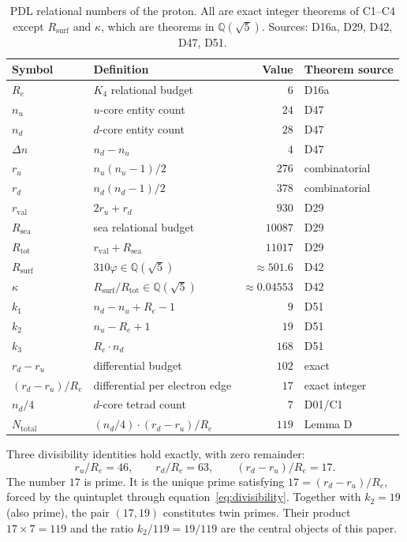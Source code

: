 \documentclass[12pt,a4paper]{article}
\theoremstyle{plain}
\theoremstyle{definition}
\theoremstyle{remark}
\newcommand{\Kfour}{K_4}
\newcommand{\vp}{\varphi}
\newcommand{\kap}{\kappa}
\newcommand{\Rtot}{R_{\mathrm{tot}}}
\newcommand{\Rsurf}{R_{\mathrm{surf}}}
\newcommand{\Rsea}{R_{\mathrm{sea}}}
\newcommand{\rval}{r_{\mathrm{val}}}
\renewcommand{\Re}{R_e}
\newcommand{\ru}{r_u}
\newcommand{\rd}{r_d}
\renewcommand{\nu}{n_u}
\newcommand{\Dn}{\Delta n}
\newcommand{\Ntot}{N_{\mathrm{total}}}
\newcommand{\kone}{k_1}
\newcommand{\ktwo}{k_2}
\newcommand{\kthree}{k_3}
\begin{document}
\begin{table}[H]
\centering
\caption{PDL relational numbers of the proton. All are exact integer theorems of C1--C4 except $\Rsurf$ and $\kap$, which are theorems in $\mathbb{Q}(\sqrt{5})$. Sources: D16a, D29, D42, D47, D51.}
\label{tab:relational}
\bigskip
\begin{tabular}{llrl}
\toprule
Symbol & Definition & Value & Theorem source \\
\midrule
$\Re$ & $\Kfour$ relational budget & $6$ & D16a \\
$n_u$ & $u$-core entity count & $24$ & D47 \\
$n_d$ & $d$-core entity count & $28$ & D47 \\
$\Dn$ & $n_d - n_u$ & $4$ & D47 \\
$\ru$ & $n_u(n_u-1)/2$ & $276$ & combinatorial \\
$\rd$ & $n_d(n_d-1)/2$ & $378$ & combinatorial \\
$\rval$ & $2\ru + \rd$ & $930$ & D29 \\
$\Rsea$ & sea relational budget & $10087$ & D29 \\
$\Rtot$ & $\rval + \Rsea$ & $11017$ & D29 \\
$\Rsurf$ & $310\vp \in \mathbb{Q}(\sqrt{5})$ & $\approx 501.6$ & D42 \\
$\kap$ & $\Rsurf/\Rtot \in \mathbb{Q}(\sqrt{5})$ & $\approx 0.04553$ & D42 \\
$\kone$ & $n_d - \nu + \Re - 1$ & $9$ & D51 \\
$\ktwo$ & $\nu - \Re + 1$ & $19$ & D51 \\
$\kthree$ & $\Re \cdot n_d$ & $168$ & D51 \\
\midrule
$\rd - \ru$ & differential budget & $102$ & exact \\
$(\rd-\ru)/\Re$ & differential per electron edge & $17$ & exact integer \\
$n_d/4$ & $d$-core tetrad count & $7$ & D01/C1 \\
$\Ntot$ & $(n_d/4)\cdot(\rd-\ru)/\Re$ & $119$ & Lemma D \\
\bottomrule
\end{tabular}
\end{table}

Three divisibility identities hold exactly, with zero remainder:
\begin{equation}
\ru / \Re = 46, \qquad \rd / \Re = 63, \qquad (\rd - \ru)/\Re = 17.
\label{eq:divisibility}
\end{equation}
The number $17$ is prime. It is the unique prime satisfying $17 = (\rd-\ru)/\Re$, forced by the quintuplet through equation~\eqref{eq:divisibility}. Together with $\ktwo = 19$ (also prime), the pair $(17, 19)$ constitutes twin primes. Their product $17\times 7 = 119$ and the ratio $\ktwo/119 = 19/119$ are the central objects of this paper.
\end{document}
